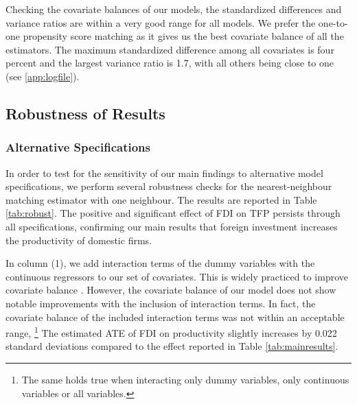 \documentclass[a4paper,11pt]{scrartcl}
\begin{document}
Checking the covariate balances of our models, the standardized differences and variance ratios are within a very good range for all models. We prefer the one-to-one propensity score matching as it gives us the best covariate balance of all the estimators. The maximum standardized difference among all covariates is four percent and the largest variance ratio is 1.7, with all others being close to one (see \ref{app:logfile}). 


\subsection{Robustness of Results}

\subsubsection*{Alternative Specifications} 
In order to test for the sensitivity of our main findings to alternative model specifications, we perform several robustness checks for the nearest-neighbour matching estimator with one neighbour. 
The results are reported in Table \ref{tab:robust}. The positive and significant effect of FDI on TFP persists through all specifications, confirming our main results that foreign investment increases the productivity of domestic firms. 

In column (1), we add interaction terms of the dummy variables with the continuous regressors to our set of covariates. This is widely practiced to improve covariate balance \citep{Caliendo08}.
However, the covariate balance of our model does not show notable improvements with the inclusion of interaction terms. In fact, the covariate balance of the included interaction terms was not within an acceptable range, %
\footnote{The same holds true when interacting only dummy variables, only continuous variables or all variables.} The estimated ATE of FDI on productivity slightly increases by 0.022 standard deviations compared to the effect reported in Table \ref{tab:mainresults}. 
\end{document}
